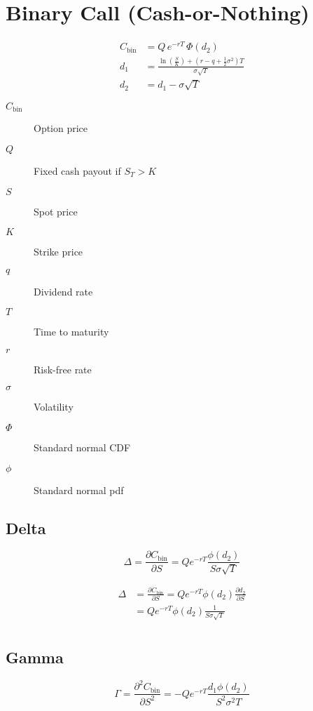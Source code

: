 \documentclass[12pt,a4paper]{article}
\begin{document}
\newpage

\section{Binary Call (Cash-or-Nothing)}

\[
  \begin{aligned}
    C_{\mathrm{bin}} & = Q \, e^{-rT} \,\Phi(d_2) \\
    d_1 & = \frac{\ln\!\left(\tfrac{S}{K}\right) + (r - q + \tfrac{1}{2}\sigma^2)T}{\sigma \sqrt{T}} \\
    d_2 & = d_1 - \sigma \sqrt{T}
  \end{aligned}
\]

\begin{description}
  \item[$C_{\mathrm{bin}}$] Option price
  \item[$Q$] Fixed cash payout if \( S_T > K \)
  \item[$S$] Spot price
  \item[$K$] Strike price
  \item[$q$] Dividend rate
  \item[$T$] Time to maturity
  \item[$r$] Risk-free rate
  \item[$\sigma$] Volatility
  \item[$\Phi$] Standard normal CDF
  \item[$\phi$] Standard normal pdf
\end{description}

\subsection{Delta}
\[
  \boxed{\Delta = \frac{\partial C_{\mathrm{bin}}}{\partial S} = Qe^{-rT}\frac{\phi(d_2)}{S\sigma\sqrt{T}}}
\]

\[
  \begin{aligned}
    \Delta & = \frac{\partial C_{\mathrm{bin}}}{\partial S} = Qe^{-rT}\phi(d_2)\frac{\partial d_2}{\partial S} \\
           & = Qe^{-rT}\phi(d_2)\frac{1}{S\sigma\sqrt{T}} \\ 
  \end{aligned}
\]

\subsection{Gamma}
\[
  \boxed{\Gamma = \frac{\partial^2 C_{\mathrm{bin}}}{\partial S^2} = -Qe^{-rT}\frac{d_1\phi(d_2)}{S^2\sigma^2T}}
\]
\end{document}
